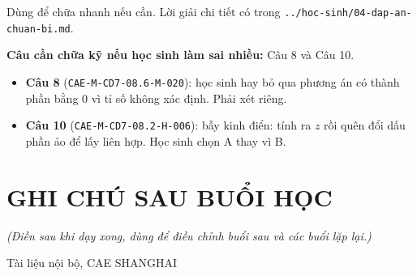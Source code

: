\documentclass[11pt, a4paper]{article}
\begin{document}
Dùng để chữa nhanh nếu cần. Lời giải chi tiết có trong \texttt{../hoc-sinh/04-dap-an-chuan-bi.md}.


\textbf{Câu cần chữa kỹ nếu học sinh làm sai nhiều:} Câu 8 và Câu 10.

\begin{itemize}[leftmargin=1.4em, itemsep=2pt]
\item \textbf{Câu 8} (\texttt{CAE-M-CD7-08.6-M-020}): học sinh hay bỏ qua phương án có thành phần bằng $0$ vì tỉ số không xác định. Phải xét riêng.
\item \textbf{Câu 10} (\texttt{CAE-M-CD7-08.2-H-006}): bẫy kinh điển: tính ra $z$ rồi quên đổi dấu phần ảo để lấy liên hợp. Học sinh chọn A thay vì B.
\end{itemize}

\section{GHI CHÚ SAU BUỔI HỌC}

\emph{(Điền sau khi dạy xong, dùng để điều chỉnh buổi sau và các buổi lặp lại.)}

\vspace{0.8cm}
\begin{center}
{\footnotesize\color{cae_blue} Tài liệu nội bộ, CAE SHANGHAI}
\end{center}
\end{document}
